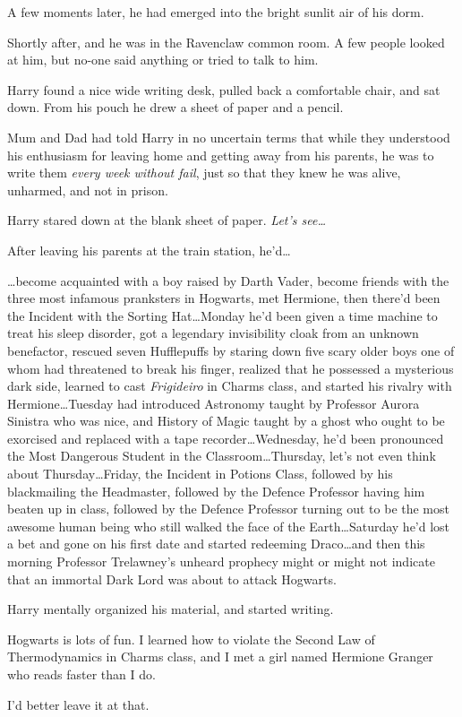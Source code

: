 A few moments later, he had emerged into the bright sunlit air of his dorm.

Shortly after, and he was in the Ravenclaw common room. A few people looked at him, but no-one said anything or tried to talk to him.

Harry found a nice wide writing desk, pulled back a comfortable chair, and sat down. From his pouch he drew a sheet of paper and a pencil.

Mum and Dad had told Harry in no uncertain terms that while they understood his enthusiasm for leaving home and getting away from his parents, he was to write them \emph{every week without fail}, just so that they knew he was alive, unharmed, and not in prison.

Harry stared down at the blank sheet of paper. \emph{Let’s see…}

After leaving his parents at the train station, he’d…

…become acquainted with a boy raised by Darth Vader, become friends with the three most infamous pranksters in Hogwarts, met Hermione, then there’d been the Incident with the Sorting Hat…Monday he’d been given a time machine to treat his sleep disorder, got a legendary invisibility cloak from an unknown benefactor, rescued seven Hufflepuffs by staring down five scary older boys one of whom had threatened to break his finger, realized that he possessed a mysterious dark side, learned to cast \emph{Frigideiro} in Charms class, and started his rivalry with Hermione…Tuesday had introduced Astronomy taught by Professor Aurora Sinistra who was nice, and History of Magic taught by a ghost who ought to be exorcised and replaced with a tape recorder…Wednesday, he’d been pronounced the Most Dangerous Student in the Classroom…Thursday, let’s not even think about Thursday…Friday, the Incident in Potions Class, followed by his blackmailing the Headmaster, followed by the Defence Professor having him beaten up in class, followed by the Defence Professor turning out to be the most awesome human being who still walked the face of the Earth…Saturday he’d lost a bet and gone on his first date and started redeeming Draco…and then this morning Professor Trelawney’s unheard prophecy might or might not indicate that an immortal Dark Lord was about to attack Hogwarts.

Harry mentally organized his material, and started writing.

\begin{writtenNote}

Hogwarts is lots of fun. I learned how to violate the Second Law of Thermodynamics in Charms class, and I met a girl named Hermione Granger who reads faster than I do.

I’d better leave it at that.

\end{writtenNote}


